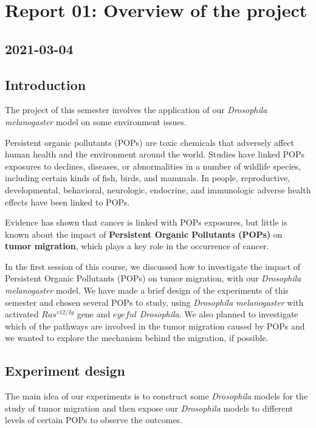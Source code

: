 \newpage
\section{Report 01: Overview of the project}

\subsection*{2021-03-04}

\subsection{Introduction}
The project of this semester involves the application of our \textit{Drosophila melanogaster} model
on some environment issues. 

Persistent organic pollutants (POPs) are toxic chemicals 
that adversely affect human health and the environment around the world. 
Studies have linked POPs exposures to declines, 
diseases, or abnormalities in a number of wildlife species, including certain kinds of fish, birds, and mammals. 
In people, reproductive, developmental, behavioral, neurologic, endocrine, 
and immunologic adverse health effects have been linked to POPs.\cite{ashraf2017persistent}

Evidence has shown that cancer is linked with POPs exposures\cite{hardell2006utero}, but little is known about
the impact of \textbf{Persistent Organic Pollutants (POPs)} on \textbf{tumor migration}, 
which plays a key role in the occurrence of cancer.

In the first session of this course, 
we discussed how to investigate the impact of Persistent Organic Pollutants (POPs) on tumor migration,
with our \textit{Drosophila melanogaster} model.
We have made a brief design of the experiments of this semester and chosen several POPs to study, 
using \textit{Drosophila melanogaster} with activated $Ras^{v12/Ig}$ gene and $eyeful$ \textit{Drosophila}.
We also planned to investigate which of the pathways are involved in the tumor migration
caused by POPs and we wanted to explore the mechanism behind the migration, if possible.

\subsection{Experiment design}
The main idea of our experiments is to construct some \textit{Drosophila} models for the study of tumor migration 
and then expose our \textit{Drosophila} models to different levels of certain POPs to observe the outcomes.

